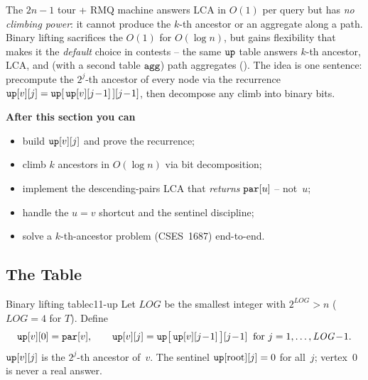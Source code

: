 \begin{topicintro}
The \(2n\!-\!1\) tour + RMQ machine answers LCA in \(O(1)\) per query but
has \emph{no climbing power}: it cannot produce the \(k\)-th ancestor or
an aggregate along a path.  Binary lifting sacrifices the \(O(1)\) for
\(O(\log n)\), but gains flexibility that makes it the \emph{default}
choice in contests -- the same \(\texttt{up}\) table answers \(k\)-th
ancestor, LCA, and (with a second table \(\texttt{agg}\)) path aggregates
().  The idea is one sentence: precompute the
\(2^j\)-th ancestor of every node via the recurrence
\(\texttt{up}[v][j] = \texttt{up}[\,\texttt{up}[v][j\!-\!1]\,][j\!-\!1]\),
then decompose any climb into binary bits.

\textbf{After this section you can}
\begin{itemize}[nosep]
  \item build \(\texttt{up}[v][j]\) and prove the recurrence; \hfill{}
  \item climb \(k\) ancestors in \(O(\log n)\) via bit decomposition; \hfill{}
  \item implement the descending-pairs LCA that \emph{returns}
        \(\texttt{par}[u]\) -- not~\(u\); \hfill{}
  \item handle the \(u = v\) shortcut and the sentinel discipline; \hfill{}
  \item solve a \(k\)-th-ancestor problem (CSES~1687) end-to-end. \hfill{}
\end{itemize}
\end{topicintro}

\subsection{The Table}

\begin{definition}{Binary lifting table}{c11-up}
Let \(\mathit{LOG}\) be the smallest integer with \(2^{\mathit{LOG}} > n\)  (\(\mathit{LOG} = 4\)
for \(T\)).  Define
\[
  \texttt{up}[v][0] = \texttt{par}[v], \qquad
  \texttt{up}[v][j] = \texttt{up}\bigl[\,\texttt{up}[v][j\!-\!1]\,\bigr][j\!-\!1]
  \;\;\text{for } j = 1, \dots, \mathit{LOG}\!-\!1.
\]
\(\texttt{up}[v][j]\) is the \(2^j\)-th ancestor of~\(v\).  The sentinel
\(\texttt{up}[\text{root}][j] = 0\) for all~\(j\); vertex~0 is never a real
answer.
\end{definition}

